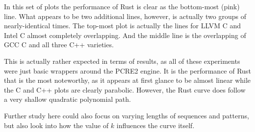 In this set of plots the performance of Rust is clear as the bottom-most (pink) line. What appears to be two additional lines, however, is actually two groups of nearly-identical times. The top-most plot is actually the lines for LLVM C and Intel C almost completely overlapping. And the middle line is the overlapping of GCC C and all three C++ varieties.

This is actually rather expected in terms of results, as all of these experiments were just basic wrappers around the PCRE2 engine. It is the performance of Rust that is the most noteworthy, as it appears at first glance to be almost linear while the C and C++ plots are clearly parabolic. However, the Rust curve does follow a very shallow quadratic polynomial path.

Further study here could also focus on varying lengths of sequences and patterns, but also look into how the value of $k$ influences the curve itself.
